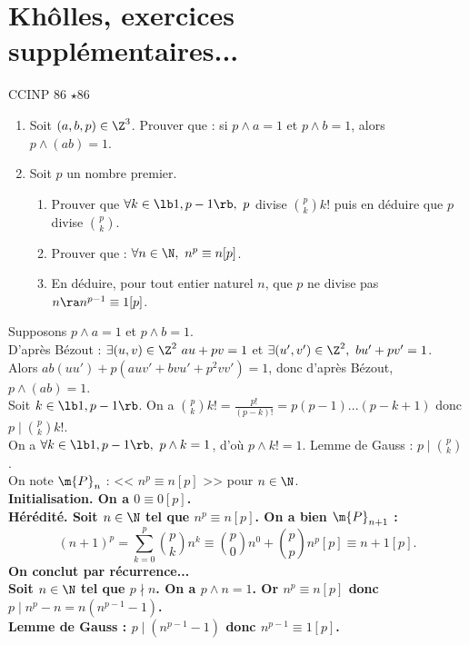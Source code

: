 \documentclass[11pt]{article}
\begin{document}
\fin

\pagebreak

\section{Khôlles, exercices supplémentaires...}


\begin{exercice}{CCINP 86 $\star$}{86}
    \begin{enumerate}
        \item Soit $(a,b,p)\in\Z^3$. Prouver que : si $p\land a=1$ et $p\land b=1$, alors $p\land(ab)=1$.
        \item Soit $p$ un nombre premier.
        \begin{enumerate}
            \item Prouver que $\forall k \in \lb1,p-1\rb, ~ p$ divise $\binom{p}{k}k!$ puis en déduire que $p$ divise $\binom{p}{k}$.
            \item Prouver que : $\forall n \in \N, ~ n^p\equiv n[p]$.
            \item En déduire, pour tout entier naturel $n$, que $p$ ne divise pas $n\ra n^{p-1}\equiv1[p]$.
        \end{enumerate}
    \end{enumerate}
    \tcblower
     Supposons $p\land a = 1$ et $p\land b=1$.\\
    D'après Bézout : $\exists (u,v)\in\Z^2 ~ au+pv=1$ et $\exists (u',v')\in\Z^2, ~ bu'+pv'=1$.\\
    Alors $ab(uu')+p(auv'+bvu'+p^2vv')=1$, donc d'après Bézout, $p\land(ab)=1$.\\
     Soit $k\in\lb1,p-1\rb$. On a $\binom{p}{k}k!=\frac{p!}{(p-k)!}=p(p-1)...(p-k+1)$ donc $p\mid\binom{p}{k}k!$.\\
    On a $\forall k \in \lb 1, p-1\rb, ~ p \land k = 1$, d'où $p\land k! = 1$. Lemme de Gauss : $p\mid \binom{p}{k}$.\\
     On note $\m{P}_n$ : << $n^p\equiv n[p]$ >> pour $n\in\N$.\\
    \bf{Initialisation.} On a $0\equiv0[p]$.\\
    \bf{Hérédité.} Soit $n\in\N$ tel que $n^p\equiv n[p]$. On a bien $\m{P}_{n+1}$ :
    \begin{equation*}
        (n+1)^p=\sum_{k=0}^p\binom{p}{k}n^k\equiv\binom{p}{0}n^0+\binom{p}{p}n^p[p]\equiv n+1[p].
    \end{equation*}
    On conclut par récurrence...\\
     Soit $n\in\N$ tel que $p\nmid n$. On a $p\land n=1$. Or $n^p\equiv n[p]$ donc $p\mid n^p-n=n(n^{p-1}-1)$.\\
    Lemme de Gauss : $p\mid (n^{p-1}-1)$ donc $n^{p-1}\equiv1[p]$.
\end{exercice}
\end{document}
